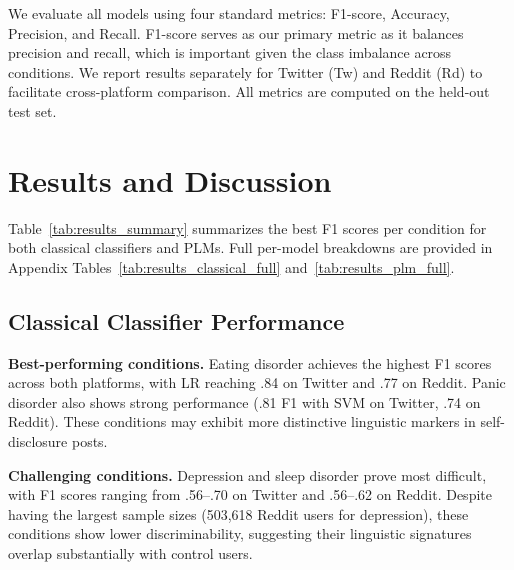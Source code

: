 \documentclass[11pt]{article}
\begin{document}
We evaluate all models using four standard metrics: F1-score, Accuracy, Precision, and Recall. F1-score serves as our primary metric as it balances precision and recall, which is important given the class imbalance across conditions. We report results separately for Twitter (Tw) and Reddit (Rd) to facilitate cross-platform comparison. All metrics are computed on the held-out test set.



%

\section{Results and Discussion}
\label{sec:results}

Table~\ref{tab:results_summary} summarizes the best F1 scores per condition for both classical classifiers and PLMs. Full per-model breakdowns are provided in Appendix Tables~\ref{tab:results_classical_full} and~\ref{tab:results_plm_full}.

% 

\subsection{Classical Classifier Performance}

\textbf{Best-performing conditions.} Eating disorder achieves the highest F1 scores across both platforms, with LR reaching .84 on Twitter and .77 on Reddit. Panic disorder also shows strong performance (.81 F1 with SVM on Twitter, .74 on Reddit). These conditions may exhibit more distinctive linguistic markers in self-disclosure posts.

\textbf{Challenging conditions.} Depression and sleep disorder prove most difficult, with F1 scores ranging from .56--.70 on Twitter and .56--.62 on Reddit. Despite having the largest sample sizes (503,618 Reddit users for depression), these conditions show lower discriminability, suggesting their linguistic signatures overlap substantially with control users.
\end{document}
